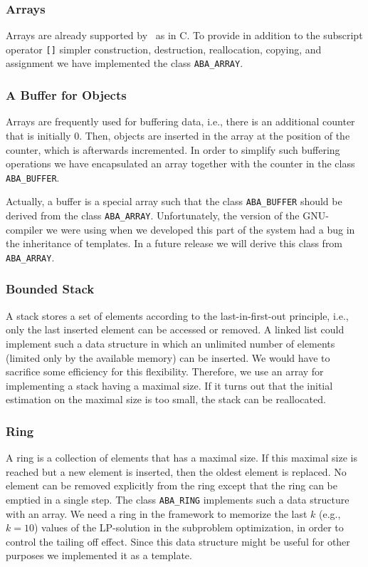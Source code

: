 \subsubsection{Arrays}
\noindent
Arrays are already supported by \CPLUSPLUS\ as in C. To provide in addition
to the subscript operator {\tt []} simpler
construction, destruction, reallocation, copying, and assignment
we have implemented the class {\tt ABA\_ARRAY}.

\subsubsection{A Buffer for Objects}
\noindent
Arrays are frequently used for buffering data, i.e., there is an additional
counter that is initially 0. Then, objects are inserted in the array
at the position of the counter, which is afterwards incremented.
In order to simplify such buffering operations we have encapsulated
an array together with the counter in the class 
{{\tt ABA\_BUFFER}}.

Actually, a buffer is a special array such that the class {\tt ABA\_BUFFER}
should be derived from the class {\tt ABA\_ARRAY}. Unfortunately, the version
of the GNU-compiler we were using when we developed this part of the
system had a bug in the inheritance of templates. In a future
release we will derive this class from {\tt ABA\_ARRAY}.

\subsubsection{Bounded Stack}
\noindent
A stack stores a set of elements according to the last-in-first-out
principle, i.e., only the last inserted element can be accessed or 
removed. A linked list could implement such a data structure in which
an unlimited number of elements (limited only by the available memory)
can be inserted. We would have to sacrifice some efficiency for this 
flexibility. Therefore, we use an array for implementing a stack
having a maximal size. If it turns out that the initial estimation on
the maximal size is too small, the stack can be reallocated.

\subsubsection{Ring}
\noindent
A ring is a collection of elements that has a maximal size.
If this maximal size is reached but a new element is inserted, then
the oldest element is replaced. No element can be removed 
explicitly from the ring except that the ring can be emptied in a
single step. The class {\tt ABA\_RING} implements such a data structure
with an array.
We need a ring in the framework to memorize the last $k$ (e.g., $k = 10$)
values of the LP-solution in the subproblem optimization, in order
to control the tailing off effect. Since this data structure might
be useful for other purposes we implemented it as a template.

